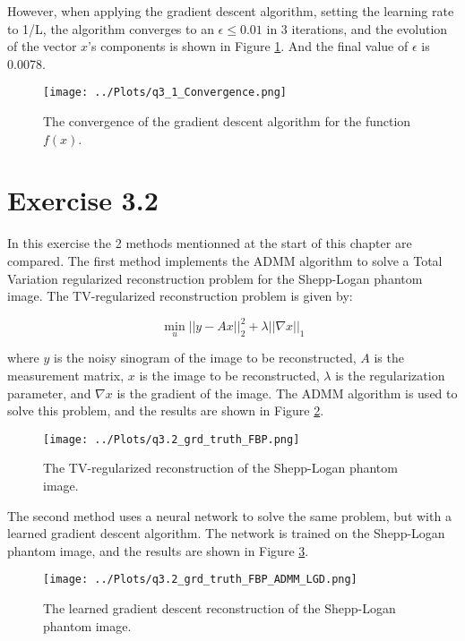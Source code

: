 \documentclass[12pt]{report} %
\begin{document}
However, when applying the gradient descent algorithm, setting the learning rate to 1/L, the algorithm converges to an $\epsilon \leq 0.01$ in 3 iterations, and the evolution of the vector $x$'s components is shown in Figure \ref{fig:gradient_descent}. And the final value of $\epsilon$ is 0.0078.

\begin{figure}[htbp]
    \centering
    \texttt{[image: ../Plots/q3\_1\_Convergence.png]}
    \caption{The convergence of the gradient descent algorithm for the function $f(x)$.}
    \label{fig:gradient_descent}
\end{figure}



\section{Exercise 3.2}

In this exercise the 2 methods mentionned at the start of this chapter are compared. The first method implements the ADMM algorithm\cite{boyd2011distributed} to solve a Total Variation regularized reconstruction problem for the Shepp-Logan phantom image. The TV-regularized reconstruction problem is given by:

\begin{equation}
    \min_{u} ||y - Ax||^2_2 + \lambda ||\nabla x||_1
\end{equation}

where $y$ is the noisy sinogram of the image to be reconstructed, $A$ is the measurement matrix, $x$ is the image to be reconstructed, $\lambda$ is the regularization parameter, and $\nabla x$ is the gradient of the image. The ADMM algorithm is used to solve this problem, and the results are shown in Figure \ref{fig:tv_reconstruction}.

\begin{figure}[htbp]
    \centering
    \texttt{[image: ../Plots/q3.2\_grd\_truth\_FBP.png]}
    \caption{The TV-regularized reconstruction of the Shepp-Logan phantom image.}
    \label{fig:tv_reconstruction}
\end{figure}

The second method uses a neural network to solve the same problem, but with a learned gradient descent algorithm. The network is trained on the Shepp-Logan phantom image, and the results are shown in Figure \ref{fig:learned_reconstruction}.

\begin{figure}[htbp]
    \centering
    \texttt{[image: ../Plots/q3.2\_grd\_truth\_FBP\_ADMM\_LGD.png]}
    \caption{The learned gradient descent reconstruction of the Shepp-Logan phantom image.}
    \label{fig:learned_reconstruction}
\end{figure}
\end{document}
